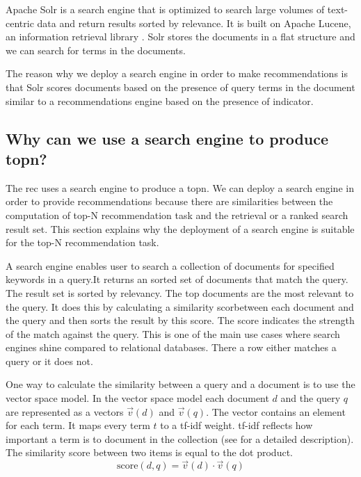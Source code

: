 Apache Solr is a search engine that is optimized to search large volumes of text-centric data and return results sorted by relevance. It is built on Apache Lucene, an information retrieval library \cite{grainger}. Solr stores the documents in a flat structure and we can search for terms in the documents.

The reason why we deploy a search engine in order to make recommendations is that Solr scores documents based on the presence of query terms in the document similar to a recommendations engine based on the presence of indicator.

\subsection{Why can we use a search engine to produce \gls{topn}?}
\label{sec:relation}

The \gls{rec} uses a search engine to produce a \gls{topn}. We can deploy a search engine in order to provide recommendations because there are similarities between the computation of top-N recommendation task and the retrieval or a ranked search result set.
 This section explains why the deployment of a search engine is suitable for the top-N recommendation task.

A search engine enables user to search a collection of documents for specified keywords in a query.It returns an sorted set of documents that match the query. The result set is sorted by relevancy. The top documents are the most relevant to the query. It does this by calculating a similarity scorbetween each document and the query and then sorts the result by this score. The score indicates the strength of the match against the query. This is one of the main use cases where search engines shine compared to relational databases. There a row either matches a query or it does not. 

One way to calculate the similarity between a query and a document is to use the vector space model.
In the vector space model each document $d$ and the query $q$ are represented as a vectors $\vec{v}(d)$ and $\vec{v}(q)$. The vector contains an element for each term. It maps every term $t$ to a tf-idf weight. tf-idf reflects how important a term is to document in the collection (see \cite{Manning} for a detailed description). 
The similarity score between two items is equal to the dot product.
\begin{equation}
  \label{eq:score}
  \text{score}(d,q) = \vec{v}(d) \cdot \vec{v}(q)
\end{equation}


